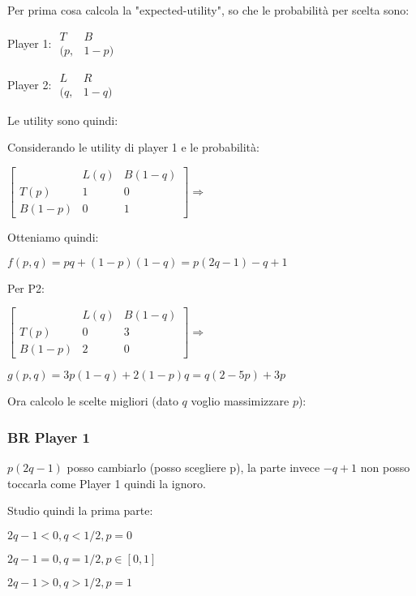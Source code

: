 \documentclass[10pt,a4paper]{report}
\begin{document}
        Per prima cosa calcola la "expected-utility", so che le probabilità per scelta sono:

        Player 1: $\begin{matrix}
            T & B \\
            (p, & 1-p)
        \end{matrix}$

        Player 2: $\begin{matrix}
            L & R \\
            (q, & 1-q)
        \end{matrix}$

        Le utility sono quindi:
        
        Considerando le utility di player 1 e le probabilità:

        $\begin{bmatrix}
            & L(q) & B(1-q) \\
            T(p) & 1 & 0 \\
            B(1-p) & 0 & 1
        \end{bmatrix} \Rightarrow $
        
        Otteniamo quindi:

        $f(p,q)= pq + (1-p)(1-q) = p(2q-1)-q+1$

        Per P2:

        $\begin{bmatrix}
            & L(q) & B(1-q) \\
            T(p) & 0 & 3 \\
            B(1-p) & 2 & 0
        \end{bmatrix} \Rightarrow $

        $g(p,q)= 3p(1-q) + 2(1-p)q = q(2 - 5p) + 3p$

        Ora calcolo le scelte migliori (dato $q$ voglio massimizzare $p$):

        \subsubsection{BR Player 1}
        $p(2q-1)$ posso cambiarlo (posso scegliere p), la parte invece $-q+1$ non posso toccarla come Player 1 quindi la ignoro.

        Studio quindi la prima parte:

        $2q-1 < 0, q < 1/2, p=0$

        $2q-1 = 0, q = 1/2, p \in [0,1]$

        $2q-1 > 0, q > 1/2, p=1$
\end{document}
